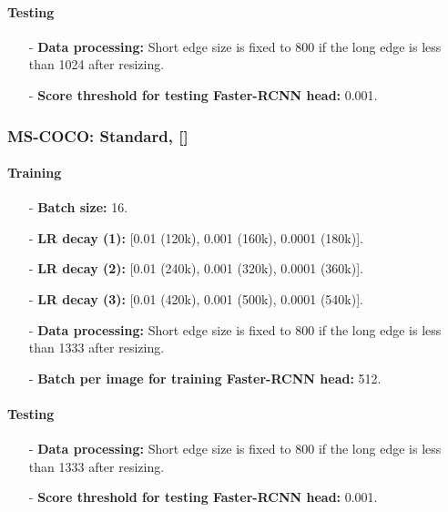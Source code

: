 \documentclass[final]{cvpr}
\begin{document}
\paragraph{Testing}
\begin{itemize}
\item[-] \textbf{Data processing:} Short edge size is fixed to 800 if the long edge is less than 1024 after resizing.
\item[-] \textbf{Score threshold for testing Faster-RCNN head:} 0.001.
\end{itemize}





\subsubsection{MS-COCO: Standard, [] }
\paragraph{Training}
\begin{itemize}
\item[-] \textbf{Batch size:} 16. 

\item[-] \textbf{LR decay (1):} [0.01 (120k), 0.001 (160k), 0.0001 (180k)].

\item[-] \textbf{LR decay (2):} [0.01 (240k), 0.001 (320k), 0.0001 (360k)].

\item[-] \textbf{LR decay (3):} [0.01 (420k), 0.001 (500k), 0.0001 (540k)].

\item[-] \textbf{Data processing:} Short edge size is fixed to 800 if the long edge is less than 1333 after resizing.

\item[-] \textbf{Batch per image for training Faster-RCNN head:} 512.
\end{itemize}

\paragraph{Testing}
\begin{itemize}
\item[-] \textbf{Data processing:} Short edge size is fixed to 800 if the long edge is less than 1333 after resizing.
\item[-] \textbf{Score threshold for testing Faster-RCNN head:} 0.001.
\end{itemize}
\end{document}
